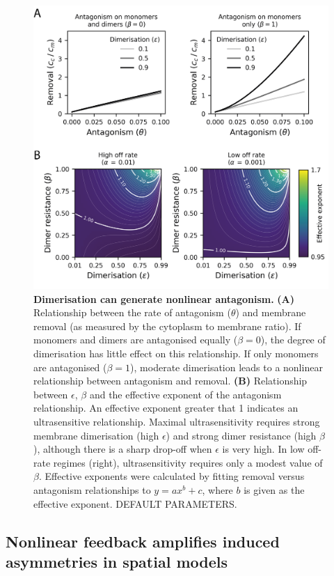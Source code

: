 \documentclass[12pt]{"report"}
\newcommand{\mycaption}[2]{\caption[#1]{\textbf{#1.} #2}}
\begin{document}
\begin{figure}
\includegraphics[scale=1]{model_antagonism_effective_exponent}
\centering
\mycaption{Dimerisation can generate nonlinear antagonism}{
\textbf{(A)} Relationship between the rate of antagonism ($\theta$) and membrane removal (as measured by the cytoplasm to membrane ratio). If monomers and dimers are antagonised equally ($\beta = 0$), the degree of dimerisation has little effect on this relationship. If only monomers are antagonised ($\beta = 1$), moderate dimerisation leads to a nonlinear relationship between antagonism and removal. 
\textbf{(B)} Relationship between $\epsilon$, $\beta$ and the effective exponent of the antagonism relationship. An effective exponent greater that 1 indicates an ultrasensitive relationship. Maximal ultrasensitivity requires strong membrane dimerisation (high $\epsilon$) and strong dimer resistance (high $\beta$), although there is a sharp drop-off when $\epsilon$ is very high. In low off-rate regimes (right), ultrasensitivity requires only a modest value of $\beta$. Effective exponents were calculated by fitting removal versus antagonism relationships to $y = a x^b + c$, where $b$ is given as the effective exponent.
DEFAULT PARAMETERS.
}
\label{fig:model_antagonism_effective_exponent}
\end{figure}

\clearpage
\subsection{Nonlinear feedback amplifies induced asymmetries in spatial models}
\end{document}

